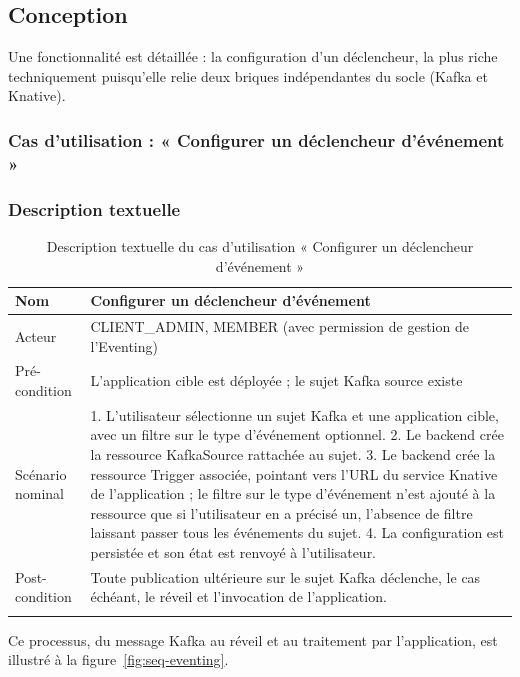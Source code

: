 \subsection{Conception}

Une fonctionnalité est détaillée : la configuration d'un déclencheur, la plus riche techniquement puisqu'elle relie deux briques indépendantes du socle (Kafka et Knative).

\needspace{0.45\textheight}
\subsubsection{Cas d'utilisation : « Configurer un déclencheur d'événement »}

\subsubsection*{Description textuelle}

\renewcommand{\arraystretch}{1.5}
\begin{longtable}{|p{4cm}|p{11cm}|}
\hline
Nom & Configurer un déclencheur d'événement \\
\hline
Acteur & CLIENT\_ADMIN, MEMBER (avec permission de gestion de l'Eventing) \\
\hline
Pré-condition & L'application cible est déployée ; le sujet Kafka source existe \\
\hline
Scénario nominal & 1. L'utilisateur sélectionne un sujet Kafka et une application cible, avec un filtre sur le type d'événement optionnel. 2. Le backend crée la ressource KafkaSource rattachée au sujet. 3. Le backend crée la ressource Trigger associée, pointant vers l'URL du service Knative de l'application ; le filtre sur le type d'événement n'est ajouté à la ressource que si l'utilisateur en a précisé un, l'absence de filtre laissant passer tous les événements du sujet. 4. La configuration est persistée et son état est renvoyé à l'utilisateur. \\
\hline
Post-condition & Toute publication ultérieure sur le sujet Kafka déclenche, le cas échéant, le réveil et l'invocation de l'application. \\
\hline
\caption{Description textuelle du cas d'utilisation « Configurer un déclencheur d'événement »}
\label{tab:uc-eventing}
\end{longtable}

Ce processus, du message Kafka au réveil et au traitement par l'application, est illustré à la figure~\ref{fig:seq-eventing}.

